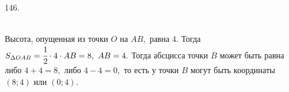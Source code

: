 146. \begin{figure}[ht!]
\end{figure}\\
Высота, опущенная из точки $O$ на $AB,$ равна 4. Тогда $S_{\Delta OAB}=\cfrac{1}{2}\cdot 4 \cdot AB=8,\ AB=4.$ Тогда абсцисса точки $B$ может быть равна либо $4+4=8,$ либо $4-4=0,$ то есть у точки $B$ могут быть координаты $(8;4)$ или $(0;4).$\\
